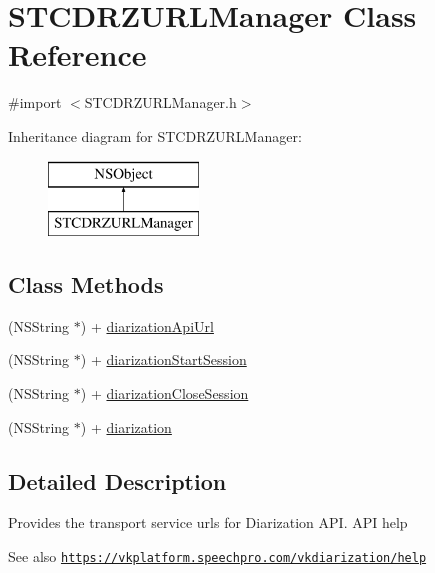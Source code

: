 \hypertarget{interface_s_t_c_d_r_z_u_r_l_manager}{}\section{S\+T\+C\+D\+R\+Z\+U\+R\+L\+Manager Class Reference}
\label{interface_s_t_c_d_r_z_u_r_l_manager}


{\ttfamily \#import $<$S\+T\+C\+D\+R\+Z\+U\+R\+L\+Manager.\+h$>$}

Inheritance diagram for S\+T\+C\+D\+R\+Z\+U\+R\+L\+Manager\+:\begin{figure}[H]
\begin{center}
\leavevmode
\includegraphics[height=2.000000cm]{interface_s_t_c_d_r_z_u_r_l_manager}
\end{center}
\end{figure}
\subsection*{Class Methods}
\begin{DoxyCompactItemize}
\item 
(N\+S\+String $\ast$) + \hyperlink{interface_s_t_c_d_r_z_u_r_l_manager_a013f98a5dd0acc40f6dbc84e99870721}{diarization\+Api\+Url}
\item 
(N\+S\+String $\ast$) + \hyperlink{interface_s_t_c_d_r_z_u_r_l_manager_a038ae99fc8452709c8a673a4a640250b}{diarization\+Start\+Session}
\item 
(N\+S\+String $\ast$) + \hyperlink{interface_s_t_c_d_r_z_u_r_l_manager_a7bbb9e68627b4a51457869d43193bc26}{diarization\+Close\+Session}
\item 
(N\+S\+String $\ast$) + \hyperlink{interface_s_t_c_d_r_z_u_r_l_manager_ac80a6da75efd4d33240e05258695ace5}{diarization}
\end{DoxyCompactItemize}


\subsection{Detailed Description}
Provides the transport service urls for Diarization A\+PI. A\+PI help \begin{DoxySeeAlso}{See also}
\href{https://vkplatform.speechpro.com/vkdiarization/help}{\tt https\+://vkplatform.\+speechpro.\+com/vkdiarization/help} 
\end{DoxySeeAlso}


